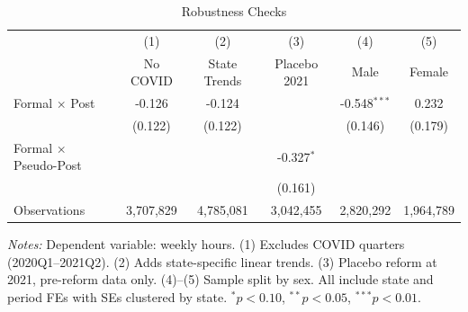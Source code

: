 \begin{table}[t]
\centering
\caption{Robustness Checks}
\label{tab:robustness}
\small
\begin{tabular}{lccccc}
  \toprule
  & (1) & (2) & (3) & (4) & (5) \\
  & No COVID & State Trends & Placebo 2021 & Male & Female \\
  \midrule
  Formal $\times$ Post & -0.126 & -0.124 & & -0.548$^{***}$ & 0.232 \\
  & (0.122) & (0.122) & & (0.146) & (0.179) \\
  Formal $\times$ Pseudo-Post & & & -0.327$^{*}$ & & \\
  & & & (0.161) & & \\
  \midrule
  Observations & 3,707,829 & 4,785,081 & 3,042,455 & 2,820,292 & 1,964,789 \\
  \bottomrule
\end{tabular}
\begin{tablenotes}
\small
\item \textit{Notes:} Dependent variable: weekly hours. (1) Excludes COVID quarters (2020Q1--2021Q2). (2) Adds state-specific linear trends. (3) Placebo reform at 2021, pre-reform data only. (4)--(5) Sample split by sex. All include state and period FEs with SEs clustered by state. $^{*}p<0.10$, $^{**}p<0.05$, $^{***}p<0.01$.
\end{tablenotes}
\end{table}
